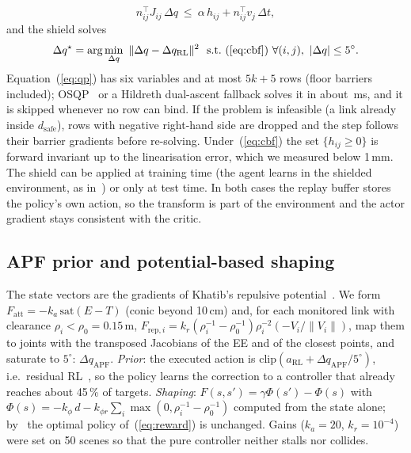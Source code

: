 \documentclass[conference]{IEEEtran}
\begin{document}
\begin{equation}
n_{ij}^\top J_{ij}\,\Delta q\ \le\ \alpha\,h_{ij}+n_{ij}^\top v_j\,\Delta t ,
\label{eq:cbf}
\end{equation}
and the shield solves
\begin{equation}
\Delta q^\star=\arg\min_{\Delta q}\ \|\Delta q-\Delta q_{\mathrm{RL}}\|^2\ \ \text{s.t.}\ (\ref{eq:cbf})\ \forall(i,j),\ |\Delta q|\le 5^\circ .
\label{eq:qp}
\end{equation}
Equation~(\ref{eq:qp}) has six variables and at most $5k+5$ rows (floor barriers included); OSQP~\cite{stellato2020osqp} or a Hildreth dual-ascent fallback solves it in about \shieldms{}\,ms, and it is skipped whenever no row can bind. If the problem is infeasible (a link already inside $d_{\mathrm{safe}}$), rows with negative right-hand side are dropped and the step follows their barrier gradients before re-solving. Under~(\ref{eq:cbf}) the set $\{h_{ij}\ge 0\}$ is forward invariant up to the linearisation error, which we measured below 1\,mm. The shield can be applied at training time (the agent learns in the shielded environment, as in~\cite{alshiekh2018shielding}) or only at test time. In both cases the replay buffer stores the policy's own action, so the transform is part of the environment and the actor gradient stays consistent with the critic.

\subsection{APF prior and potential-based shaping}
The state vectors are the gradients of Khatib's repulsive potential~\cite{khatib1986apf}. We form $F_{\mathrm{att}}=-k_a\,\mathrm{sat}(E-T)$ (conic beyond 10\,cm) and, for each monitored link with clearance $\rho_i<\rho_0=0.15$\,m, $F_{\mathrm{rep},i}=k_r(\rho_i^{-1}-\rho_0^{-1})\rho_i^{-2}(-V_i/\|V_i\|)$, map them to joints with the transposed Jacobians of the EE and of the closest points, and saturate to $5^\circ$: $\Delta q_{\mathrm{APF}}$. \emph{Prior}: the executed action is $\mathrm{clip}(a_{\mathrm{RL}}+\Delta q_{\mathrm{APF}}/5^\circ)$, i.e.\ residual RL~\cite{johannink2019residual}, so the policy learns the correction to a controller that already reaches about 45\,\% of targets. \emph{Shaping}: $F(s,s')=\gamma\Phi(s')-\Phi(s)$ with $\Phi(s)=-k_\phi\,d-k_{\phi r}\sum_i\max(0,\rho_i^{-1}-\rho_0^{-1})$ computed from the state alone; by~\cite{ng1999shaping} the optimal policy of~(\ref{eq:reward}) is unchanged. Gains ($k_a=20$, $k_r=10^{-4}$) were set on 50 scenes so that the pure controller neither stalls nor collides.
\end{document}
